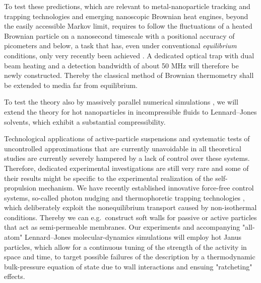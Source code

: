 \begin{workpackage}[id=WPactive,wphases=0-48,
  short=Active Particle Suspensions,%
  title=Probing active particle suspensions with colloids and polymers,
  lead=ULEI,
  ULEIRM=96,UNIPDRM=6,USTUTTRM=2]
\begin{tasklist}
\begin{task}[title=Noise Temperature,id=task3,lead=ULEI,wphases=0-24!0.5]
To test these predictions, which are relevant to metal-nanoparticle tracking and trapping technologies and emerging
nanoscopic Brownian heat engines, beyond the easily accessible Markov limit, requires to follow the fluctuations of 
a heated Brownian particle on a nanosecond timescale with a positional accuracy of picometers and below, a task 
that has, even under conventional \emph{equilibrium} conditions, only very recently been achieved \cite{kheifets-etal:2014}.
%
A dedicated optical trap with dual beam heating and a detection bandwidth of about 50 MHz
will therefore be newly constructed. 
%
Thereby the classical method of Brownian thermometry shall be extended to media far from equilibrium.

To test the theory also by massively parallel numerical simulations \cite{chakraborty-etal:2011}, 
we will extend the theory for hot nanoparticles in incompressible fluids 
to Lennard--Jones solvents, which exhibit a substantial compressibility.
\end{task}

\begin{task}[title=Active-Particle Suspensions,id=task4,lead=ULEI,wphases=24-48!0.5]
Technological applications of active-particle suspensions and systematic tests of
uncontrolled approximations that are currently unavoidable in all theoretical studies are
currently severely hampered by a lack of control over these systems.
%
Therefore, dedicated experimental investigations are still very rare and some of their
results might be specific to the experimental realization of the self-propulsion mechanism.
%
We have recently established innovative force-free control systems, so-called photon nudging
and thermophoretic trapping technologies \cite{Qian2013,Braun:NanoLetters:2015}, which deliberately exploit 
the nonequilibrium transport caused by non-isothermal conditions.
%
Thereby we can e.g.\ construct soft walls for passive or active particles that act as
semi-permeable membranes.
%
Our experiments and accompanying "all-atom" Lennard--Jones molecular-dynamics simulations \cite{chakraborty-etal:2011} 
will employ hot Janus particles, which allow for a continuous tuning of the strength of 
the activity in space and time, to target 
possible failures of the description by a thermodynamic bulk-pressure equation of
state \cite{ginot-etal:2015} due to wall interactions and ensuing "ratcheting" effects.
\end{task}


\end{tasklist}


\end{workpackage}

